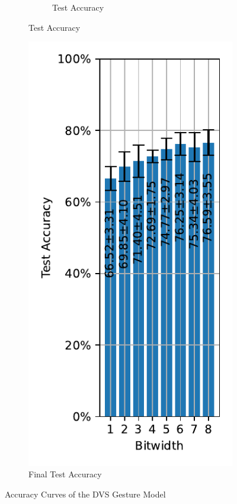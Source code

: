 \begin{figure}[H]
\begin{subfigure}[H]{0.69\textwidth}
\begin{subfigure}[H]{\textwidth}
                    \caption{Test Accuracy}
                \end{subfigure}
            \end{subfigure}
            \hfill
            \begin{subfigure}[H]{0.3\textwidth}
                \centering
                \includegraphics[width=\textwidth]{../standard/DVSGesture/plots/dvsgesture_final_acc.pdf}
                \caption{Final Test Accuracy}
            \end{subfigure}
            \caption{Accuracy Curves of the DVS Gesture Model}
        \end{figure}

